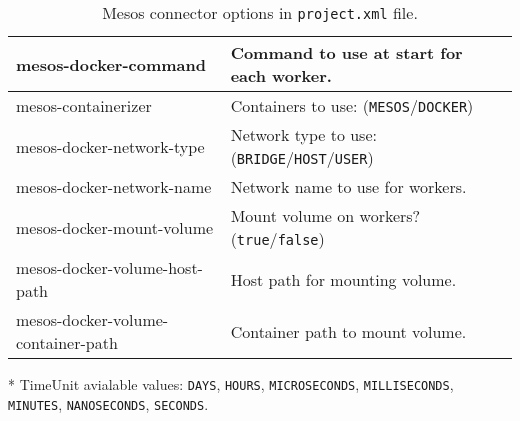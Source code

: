 \begin{table}[!ht]
\begin{tabularx}{\linewidth}{|l|X|}
	mesos-docker-command  & Command to use at start for each worker.\\ \hline

	mesos-containerizer  &  Containers to use: (\texttt{MESOS}/\texttt{DOCKER}) \\ \hline
  mesos-docker-network-type &  Network type to use: (\texttt{BRIDGE}/\texttt{HOST}/\texttt{USER}) \\ \hline
  mesos-docker-network-name & Network name to use for workers.\\ \hline
  mesos-docker-mount-volume & Mount volume on workers? (\texttt{true}/\texttt{false})\\ \hline
  mesos-docker-volume-host-path & Host path for mounting volume. \\ \hline
  mesos-docker-volume-container-path  & Container path to mount volume. \\ \hline
\end{tabularx}
\caption{Mesos connector options in \texttt{project.xml} file.}
\label{tab:mesos_extensions}
\end{table}

\newpage

\noindent
* TimeUnit avialable values: \texttt{DAYS}, \texttt{HOURS}, \texttt{MICROSECONDS}, \texttt{MILLISECONDS}, \texttt{MINUTES},
\texttt{NANOSECONDS}, \texttt{SECONDS}.
